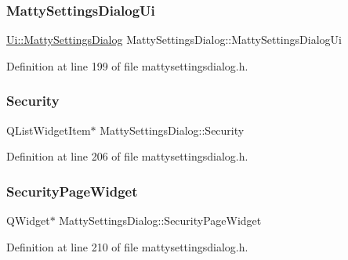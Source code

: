\subsubsection{\texorpdfstring{Matty\+Settings\+Dialog\+Ui}{MattySettingsDialogUi}}
{\footnotesize\ttfamily \hyperlink{classUi_1_1MattySettingsDialog}{Ui\+::\+Matty\+Settings\+Dialog} Matty\+Settings\+Dialog\+::\+Matty\+Settings\+Dialog\+Ui\hspace{0.3cm}{\ttfamily [private]}}



Definition at line 199 of file mattysettingsdialog.\+h.

\hypertarget{classMattySettingsDialog_a1f96950ec3adabcad3a25926649c739b}{}\label{classMattySettingsDialog_a1f96950ec3adabcad3a25926649c739b} 
\subsubsection{\texorpdfstring{Security}{Security}}
{\footnotesize\ttfamily Q\+List\+Widget\+Item$\ast$ Matty\+Settings\+Dialog\+::\+Security\hspace{0.3cm}{\ttfamily [private]}}



Definition at line 206 of file mattysettingsdialog.\+h.

\hypertarget{classMattySettingsDialog_a73e2049874e44a3ef9249942fe276be5}{}\label{classMattySettingsDialog_a73e2049874e44a3ef9249942fe276be5} 
\subsubsection{\texorpdfstring{Security\+Page\+Widget}{SecurityPageWidget}}
{\footnotesize\ttfamily Q\+Widget$\ast$ Matty\+Settings\+Dialog\+::\+Security\+Page\+Widget\hspace{0.3cm}{\ttfamily [private]}}



Definition at line 210 of file mattysettingsdialog.\+h.

\hypertarget{classMattySettingsDialog_a0311fa433fe036e18ea683a4f256098b}{}\label{classMattySettingsDialog_a0311fa433fe036e18ea683a4f256098b} 
